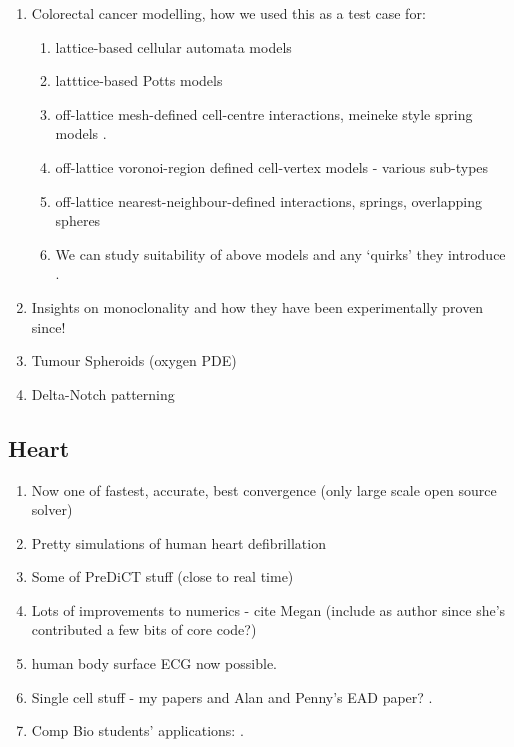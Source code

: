 \documentclass[10pt]{article}
\begin{document}
\begin{enumerate}
    \item Colorectal cancer modelling, how we used this as a test case for:
    \begin{enumerate}
	\item lattice-based cellular automata models
	\item latttice-based Potts models
	\item off-lattice mesh-defined cell-centre interactions, meineke style spring models \cite{VanLeeuwen2009,fletcher2012mathematical,Dunn2012}.
	\item off-lattice voronoi-region defined cell-vertex models - various sub-types
	\item off-lattice nearest-neighbour-defined interactions, springs, overlapping spheres
	\item We can study suitability of above models and any `quirks' they introduce \cite{Pathmanathan2009,Osborne2010}.
    \end{enumerate}
    \item Insights on monoclonality and how they have been experimentally proven since!
    \item Tumour Spheroids (oxygen PDE)
    \item Delta-Notch patterning
\end{enumerate}

\subsection*{Heart}

\begin{enumerate}
    \item Now one of fastest, accurate, best convergence (only large scale open source solver) \cite{bordas2009simulation,niederer2011verification}
    \item Pretty simulations of human heart defibrillation
    \item Some of PreDiCT stuff (close to real time)
    \item Lots of improvements to numerics \cite{Bernabeu2009a,Pathmanathan2010ngb,Bernabeu2010,Pathmanathan2011} - cite Megan (include as author since she's contributed a few bits of core code?)
    \item human body surface ECG now possible.
    \item Single cell stuff - my papers and Alan and Penny's EAD paper? \cite{Mirams2011,Cooper2011cuc}.
    \item Comp Bio students' applications: \cite{Dutta2011,Walmsley2012}.
\end{enumerate}
\end{document}
